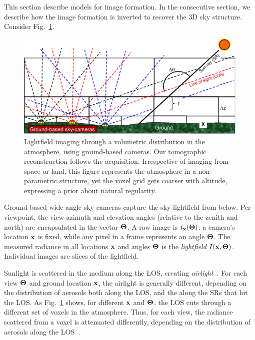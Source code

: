 \documentclass[10pt,twocolumn,letterpaper]{article}
\begin{document}
This section describe models for image formation. In the consecutive section, we describe how the image formation is inverted to recover the 3D sky structure.
Consider Fig.~\ref{fig:groundgrid}.
\begin{figure}[t!]
   \begin{center}
\vspace{-0.4cm}
    \includegraphics[width=0.99\linewidth]{groundtomog6.eps}
    \end{center}\vspace{-1.5cm}
    \caption{\small
    Lightfield imaging through a volumetric distribution in
    the atmosphere, using ground-based cameras. Our tomographic reconstruction
    follows the acquisition. Irrespective of imaging from space or land, this figure represents the atmosphere in a non-parametric structure, yet the voxel grid gets coarser with altitude, expressing a prior about natural regularity.}
   \label{fig:groundgrid}
\end{figure}
Ground-based wide-angle sky-cameras capture the sky lightfield from below. Per viewpoint, the view azimuth and elevation angles (relative to the zenith and north) are encapsulated in the vector ${\bf{\Theta}}$.  A raw image is $i_{\bf x}({\bf{\Theta}})$: a camera's location ${\bf x}$ is fixed, while any pixel in a frame represents an angle ${\bf{\Theta}}$.
The measured radiance in all locations ${\bf x}$ and angles ${\bf{\Theta}}$ is the {\em lightfield} $I({\bf x},{\bf{\Theta}})$. Individual images are slices of the lightfield.

Sunlight is scattered in the medium along the LOS, creating {\em airlight}~\cite{fattal,narasimhan2,Hschechner2,tan}. For each view ${\bf{\Theta}}$ and ground location ${\bf x}$, the airlight is generally different, depending on the distribution of aerosols both along the LOS, and the along the SRs that hit the LOS.
As Fig.~\ref{fig:groundgrid} shows, for different ${\bf x}$ and ${\bf{\Theta}}$, the LOS cuts through a different set of voxels in the atmosphere. Thus, for each view, the radiance scattered from a voxel is attenuated differently, depending on the distribution of aerosols along the LOS~\cite{hansen}.
\end{document}
